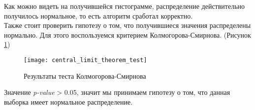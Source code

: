 Как можно видеть на получившейся гистограмме, распределение действительно получилось нормальное, то есть алгоритм сработал корректно.\\

Также стоит проверить гипотезу о том, что получившиеся значения распределены нормально. Для этого воспользуемся критерием Колмогорова-Смирнова. (Рисунок \ref{fig:central_limit_theorem_test})
\begin{figure}[h]
	\centering \texttt{[image: central\_limit\_theorem\_test]}
	\caption{Результаты теста Колмогорова-Смирнова}
	\label{fig:central_limit_theorem_test}
\end{figure}

Значение \textit{p-value} > 0.05, значит мы принимаем гипотезу о том, что данная выборка имеет нормальное распределение.